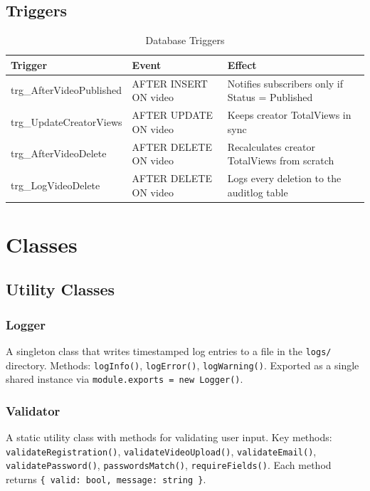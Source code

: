 \documentclass[a4paper, twoside]{article}
\begin{document}
\subsection{Triggers}

\begin{table}[H]
\centering
\caption{Database Triggers}
\label{tab:DBTriggers}
\begin{tabular}{|l|l|l|}
\hline
\textbf{Trigger}              & \textbf{Event}              & \textbf{Effect}                                     \\ \hline
trg\_AfterVideoPublished      & AFTER INSERT ON video       & Notifies subscribers only if Status = Published     \\ \hline
trg\_UpdateCreatorViews       & AFTER UPDATE ON video       & Keeps creator TotalViews in sync                    \\ \hline
trg\_AfterVideoDelete         & AFTER DELETE ON video       & Recalculates creator TotalViews from scratch        \\ \hline
trg\_LogVideoDelete           & AFTER DELETE ON video       & Logs every deletion to the auditlog table           \\ \hline
\end{tabular}
\end{table}

\section{Classes}

\subsection{Utility Classes}

\subsubsection{Logger}
A singleton class that writes timestamped log entries to a file in the \texttt{logs/} directory. Methods: \texttt{logInfo()}, \texttt{logError()}, \texttt{logWarning()}. Exported as a single shared instance via \texttt{module.exports = new Logger()}.

\subsubsection{Validator}
A static utility class with methods for validating user input. Key methods: \texttt{validateRegistration()}, \texttt{validateVideoUpload()}, \texttt{validateEmail()}, \texttt{validatePassword()}, \texttt{passwordsMatch()}, \texttt{requireFields()}. Each method returns \texttt{\{ valid: bool, message: string \}}.
\end{document}
